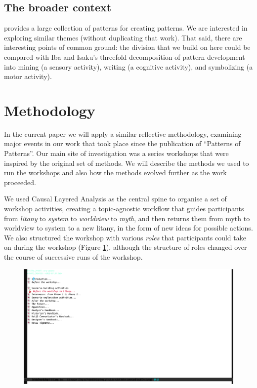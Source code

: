 \documentclass[acmlarge,timestamp]{acmart}
\begin{document}
\subsection{The broader context}
\cite{iba2016pattern} provides a large collection of patterns for creating patterns.  We are interested in exploring similar themes (without duplicating that work).   That said, there are interesting points of common ground: the division that we build on here could be compared with Iba and Isaku's threefold decomposition of pattern development into mining (a sensory activity), writing (a cognitive activity), and symbolizing (a motor activity).

\section{Methodology}
\label{sec:org134acbb}
\label{methods}

In the current paper we will apply a similar reflective methodology,
examining major events in our work that took place since the
publication of “Patterns of Patterns”.  Our main site of investigation
was a series workshops that were inspired by the original set of
methods.  We will describe the methods we used to run the workshops
and also how the methods evolved further as the work proceeded.

We used Causal Layered Analysis as the central spine to organise a set
of workshop activities, creating a topic-agnostic workflow that guides
participants from \emph{litany} to \emph{system} to \emph{worldview}
to \emph{myth}, and then returns them from myth to worldview to system
to a new litany, in the form of new ideas for possible actions.  We
also structured the workshop with various \emph{roles} that
participants could take on during the workshop (Figure
\ref{workshop-itinerary}), although the structure of roles changed
over the course of successive runs of the workshop.

\begin{figure}[h]
\includegraphics[clip, trim=1.1cm 18cm 45cm 2.5cm,width=.5\textwidth]{emacs.pdf}
\caption{\label{workshop-itinerary}}
\end{figure}
\end{document}
